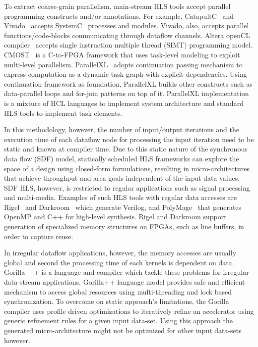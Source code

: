 To extract coarse-grain parallelism, main-stream HLS tools accept parallel programming constructs and/or annotations.
For example, CatapultC~\cite{catapult} and Vivado~\cite{vivado} accepts SystemC~\cite{systemc} processes and modules.
Vivado, also, accepts parallel functions/code-blocks communicating through dataflow channels.
Altera openCL compiler~\cite{opencl_sdk} accepts single instruction multiple thread (SIMT) programming model. 
CMOST~\cite{zhang_DAC_2015_cmost} is a C-to-FPGA framework that uses task-level modeling to exploit multi-level parallelism.
ParallelXL~\cite{chen_micro_2018_parallelXL} adopts continuation passing mechanism to express computation as a dynamic task graph with explicit dependencies.
Using continuation framework as foundation, ParallelXL builds other constructs such as data-parallel loops and for-join patterns on top of it.
ParallelXL implementation is a mixture of HCL languages to implement system architecture and standard HLS tools to implement task elements.

In this methodology, however, the number of input/output iterations and the execution time of each dataflow node for processing the input iteration need to be static and known at compiler time.
Due to this static nature of the synchronous data flow (SDF) model, statically scheduled HLS frameworks can explore the space of a design using closed-form formulations, resulting in micro-architectures that achieve throughput and area goals independent of the input data values.
SDF HLS, however, is restricted to regular applications such as signal processing and multi-media.
Examples of such HLS tools with regular data accesses are Rigel~\cite{hegarty_2016_rigel} and Darkroom~\cite{darkroom} which generate Verilog, and PolyMage~\cite{mullapudi_asplos_2015_polymage} that generates OpenMP and C++ for high-level synthesis.
Rigel and Darkroom support generation of specialized memory structures on FPGAs, such as line buffers, in order to capture reuse.

In irregular dataflow applications, however, the memory accesses are usually global and second the processing time of each kernels is dependent on data. 
Gorilla~\cite{lavasani_thesis}++ is a language and compiler which tackle these problems for irregular  data-stream applications.
Gorilla++ language model provides safe and efficient mechanism to access global resources using multi-threading and lock based synchronization.
To overcome on static approach's limitations, the Gorilla compiler uses profile driven optimizations to iteratively refine an accelerator using generic refinement rules for a given input data-set.
Using this approach the generated micro-architecture might not be optimized for other input data-sets however.

